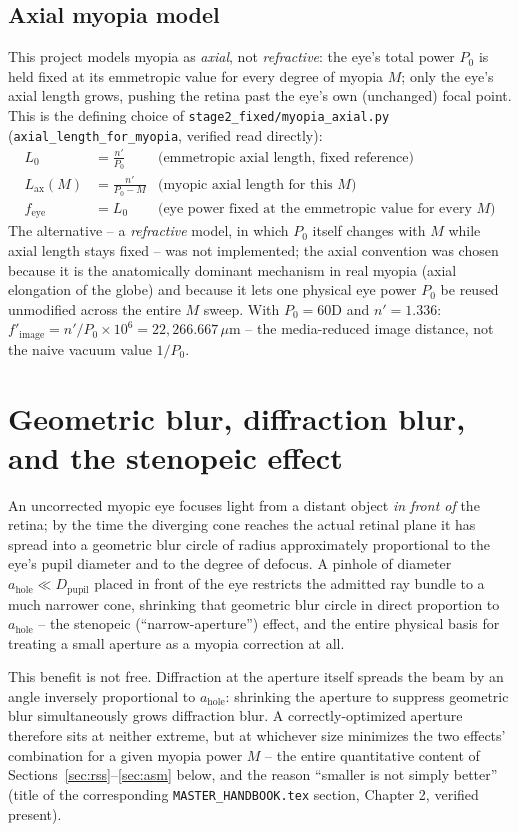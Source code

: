 \subsection{Axial myopia model}
This project models myopia as \emph{axial}, not \emph{refractive}: the eye's total power
$P_0$ is held fixed at its emmetropic value for every degree of myopia $M$; only the
eye's axial length grows, pushing the retina past the eye's own (unchanged) focal point.
This is the defining choice of \texttt{stage2\_fixed/myopia\_axial.py}
(\texttt{axial\_length\_for\_myopia}, verified read directly):
\begin{align}
L_0 &= \frac{n'}{P_0} & \text{(emmetropic axial length, fixed reference)}\\
L_{\mathrm{ax}}(M) &= \frac{n'}{P_0-M} & \text{(myopic axial length for this } M \text{)}\\
f_{\mathrm{eye}} &= L_0 & \text{(eye power fixed at the emmetropic value for every } M\text{)}
\end{align}
The alternative -- a \emph{refractive} model, in which $P_0$ itself changes with $M$
while axial length stays fixed -- was not implemented; the axial convention was chosen
because it is the anatomically dominant mechanism in real myopia (axial elongation of
the globe) and because it lets one physical eye power $P_0$ be reused unmodified across
the entire $M$ sweep. With $P_0=60$D and $n'=1.336$: $f'_{\mathrm{image}} =
n'/P_0\times10^6 = 22{,}266.667\,\mu$m -- the media-reduced image distance, not the naive
vacuum value $1/P_0$.

\section{Geometric blur, diffraction blur, and the stenopeic effect}
\label{sec:stenopeic}
An uncorrected myopic eye focuses light from a distant object \emph{in front of} the
retina; by the time the diverging cone reaches the actual retinal plane it has spread
into a geometric blur circle of radius approximately proportional to the eye's pupil
diameter and to the degree of defocus. A pinhole of diameter $a_{\mathrm{hole}} \ll
D_{\mathrm{pupil}}$ placed in front of the eye restricts the admitted ray bundle to a
much narrower cone, shrinking that geometric blur circle in direct proportion to
$a_{\mathrm{hole}}$ -- the stenopeic (``narrow-aperture'') effect, and the entire
physical basis for treating a small aperture as a myopia correction at all.

This benefit is not free. Diffraction at the aperture itself spreads the beam by an
angle inversely proportional to $a_{\mathrm{hole}}$: shrinking the aperture to suppress
geometric blur simultaneously grows diffraction blur. A correctly-optimized aperture
therefore sits at neither extreme, but at whichever size minimizes the two effects'
combination for a given myopia power $M$ -- the entire quantitative content of
Sections~\ref{sec:rss}--\ref{sec:asm} below, and the reason ``smaller is not simply
better'' (title of the corresponding \texttt{MASTER\_HANDBOOK.tex} section, Chapter 2,
verified present).

